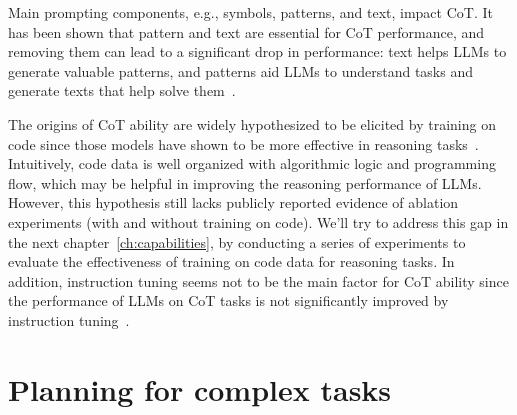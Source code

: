 Main prompting components, e.g., symbols, patterns, and text, impact CoT\@.
It has been shown that pattern and text are essential for CoT performance, and removing them can lead to a significant drop in performance: text helps LLMs to generate valuable patterns, and patterns aid LLMs to understand tasks and generate texts that help solve them~\cite{madaan2022text}.

The origins of CoT ability are widely hypothesized to be elicited by training on code since those models have shown to be more effective in reasoning tasks~\cite{fu2022gptroadmap, liang2022holistic}.
Intuitively, code data is well organized with algorithmic logic and programming flow, which may be helpful in improving the reasoning performance of LLMs. However, this hypothesis still lacks publicly reported evidence of ablation experiments (with and without training on code).
We'll try to address this gap in the next chapter~\ref{ch:capabilities}, by conducting a series of experiments to evaluate the effectiveness of training on code data for reasoning tasks.
In addition, instruction tuning seems not to be the main factor for CoT ability since the performance of LLMs on CoT tasks is not significantly improved by instruction tuning~\cite{chung2022scaling}.

\section{Planning for complex tasks}
\label{sec:planning}


